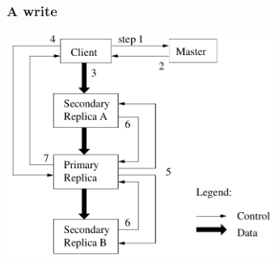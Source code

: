 \documentclass{beamer}
\newcommand{\slideheight}{7.3cm}
\begin{document}
\begin{frame}
 \frametitle{A write}
 \centering
 \includegraphics[height=\slideheight]{figures/GFSflow.png}
\end{frame}
\end{document}
